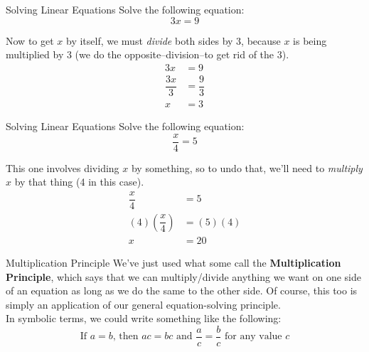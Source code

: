 \begin{example}{Solving Linear Equations}
Solve the following equation:
\[3x = 9\]

\sol
Now to get $x$ by itself, we must \emph{divide} both sides by 3, because $x$ is being multiplied by 3 (we do the opposite--division--to get rid of the 3).
\begin{align*}
3x &= 9\\
\dfrac{3x}{3} &= \dfrac{9}{3}\\
x &= \boxed{3}
\end{align*}
\end{example}

\begin{example}{Solving Linear Equations}
Solve the following equation:
\[\dfrac{x}{4} = 5\]

\sol
This one involves dividing $x$ by something, so to undo that, we'll need to \emph{multiply} $x$ by that thing (4 in this case).
\begin{align*}
\dfrac{x}{4} &= 5\\
(4) \left(\dfrac{x}{4}\right) &= (5) (4)\\
x &= \boxed{20}
\end{align*}
\end{example}

\begin{proc}{Multiplication Principle}
We've just used what some call the \textbf{Multiplication Principle}, which says that we can multiply/divide anything we want on one side of an equation as long as we do the same to the other side.  Of course, this too is simply an application of our general equation-solving principle.\\

In symbolic terms, we could write something like the following:
\[\textrm{If } a = b \textrm{, then } ac = bc \textrm{ and } \dfrac{a}{c} = \dfrac{b}{c} \textrm{ for any value } c\]
\end{proc}
\pagebreak

